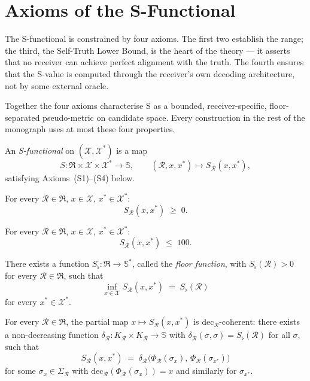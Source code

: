 \section{Axioms of the S-Functional}
\label{sec:s-axioms}

The S-functional is constrained by four axioms.  The first two establish the
range; the third, the Self-Truth Lower Bound, is the heart of the theory —
it asserts that no receiver can achieve perfect alignment with the truth.
The fourth ensures that the S-value is computed through the receiver's own
decoding architecture, not by some external oracle.

Together the four axioms characterise S as a bounded, receiver-specific,
floor-separated pseudo-metric on candidate space.  Every construction in the
rest of the monograph uses at most these four properties.

\begin{definition}
\label{def:s-functional-axiom}
An \emph{S-functional} on $(\mathcal{X}, \mathcal{X}^{*})$ is a map
\[
  S : \mathfrak{R} \times \mathcal{X} \times \mathcal{X}^{*}
  \to \mathbb{S},
  \qquad
  (\mathcal{R}, x, x^{*}) \mapsto S_{\mathcal{R}}(x, x^{*}) ,
\]
satisfying Axioms~(S1)--(S4) below.
\end{definition}

\begin{axiom}
\label{ax:S1}
For every $\mathcal{R} \in \mathfrak{R}$, $x \in \mathcal{X}$,
$x^{*} \in \mathcal{X}^{*}$:
\[
  S_{\mathcal{R}}(x, x^{*}) \;\geq\; 0 .
\]
\end{axiom}

\begin{axiom}[Boundedness — S2]
\label{ax:S2}
For every $\mathcal{R} \in \mathfrak{R}$, $x \in \mathcal{X}$,
$x^{*} \in \mathcal{X}^{*}$:
\[
  S_{\mathcal{R}}(x, x^{*}) \;\leq\; 100 .
\]
\end{axiom}

\begin{axiom}
\label{ax:S3}
There exists a function $S_\flat : \mathfrak{R} \to \mathbb{S}^{*}$,
called the \emph{floor function}, with $S_\flat(\mathcal{R}) > 0$ for every
$\mathcal{R} \in \mathfrak{R}$, such that
\[
  \inf_{x \in \mathcal{X}} S_{\mathcal{R}}(x, x^{*})
  \;=\; S_\flat(\mathcal{R})
\]
for every $x^{*} \in \mathcal{X}^{*}$.
\end{axiom}

\begin{axiom}
\label{ax:S4}
For every $\mathcal{R} \in \mathfrak{R}$, the partial map
$x \mapsto S_{\mathcal{R}}(x, x^{*})$ is
$\mathrm{dec}_{\mathcal{R}}$-coherent: there exists a non-decreasing
function
$\delta_{\mathcal{R}} : K_{\mathcal{R}} \times K_{\mathcal{R}} \to \mathbb{S}$
with $\delta_{\mathcal{R}}(\sigma, \sigma) = S_\flat(\mathcal{R})$ for all
$\sigma$, such that
\[
  S_{\mathcal{R}}(x, x^{*})
  \;=\; \delta_{\mathcal{R}}\!\bigl(\Phi_{\mathcal{R}}(\sigma_x),\,
                                    \Phi_{\mathcal{R}}(\sigma_{x^{*}})\bigr)
\]
for some $\sigma_x \in \Sigma_{\mathcal{R}}$ with
$\mathrm{dec}_{\mathcal{R}}(\Phi_{\mathcal{R}}(\sigma_x)) = x$ and
similarly for $\sigma_{x^{*}}$.
\end{axiom}


